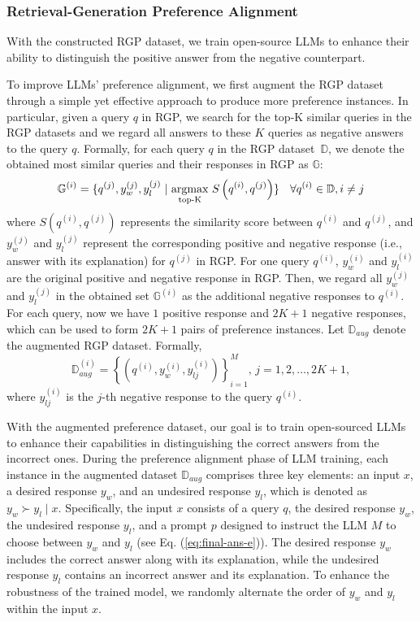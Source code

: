 \subsubsection{\textbf{Retrieval-Generation Preference Alignment}}
With the constructed RGP dataset, we train open-source LLMs to enhance their ability to distinguish the positive answer from the negative counterpart.

To improve LLMs' preference alignment, we first augment the RGP dataset through a simple yet effective approach to produce more preference instances. 
In particular, given a query $q$ in RGP, we search for the top-K similar queries in the RGP datasets and we regard all answers to these $K$ queries as negative answers to the query $q$.
Formally, for each query $q$ in the RGP dataset~$\mathbb{D}$,  we denote the obtained most similar queries and their responses in RGP as $\mathbb{G}$:  
\begin{equation} \label{eq:group}
    \small
    \mathbb{G}^{(i)} = \{ q^{(j)}, y_w^{(j)}, y_l^{(j)}~|~\underset{\text{top-}\mathrm{K}}{\mathrm{argmax}}\ S\left(q^{(i)}, q^{(j)}\right)\}~~~\forall q^{(i)} \in \mathbb{D}, i\neq j
\end{equation}
where $S(q^{(i)}, q^{(j)})$ represents the similarity score between $q^{(i)}$ and $q^{(j)}$, and $y_w^{(j)}$ and $y_l^{(j)}$ represent the corresponding positive and negative response (i.e., answer with its explanation) for $q^{(j)}$ in RGP.
For one query $q^{(i)}$, $y_w^{(i)}$ and $y_l^{(i)}$ are the original positive and negative response in RGP.
Then, we regard all $y_w^{(j)}$ and $y_l^{(j)}$ in the obtained set $\mathbb{G}^{(i)}$ as the additional negative responses to $q^{(i)}$.
For each query, now we have $1$ positive response and $2K+1$ negative responses, which can be used to form $2K+1$ pairs of preference instances. 
Let $\mathbb{D}_{aug}$ denote the augmented RGP dataset. Formally,
\begin{equation}
\mathbb{D}_{aug}^{(i)} = \left\{ \left( q^{(i)}, y_w^{(i)}, y_{lj}^{(i)} \right) \right\}_{i=1}^M, \, j=1,2,\dots,2K+1,
\end{equation}
where $y_{lj}^{(i)}$ is the $j$-th negative response to the query $q^{(i)}$. 

With the augmented preference dataset, our goal is to train open-sourced LLMs to enhance their capabilities in distinguishing the correct answers from the incorrect ones.
During the preference alignment phase of LLM training, each instance in the augmented dataset $\mathbb{D}_{aug}$ comprises three key elements: an input $x$, a desired response $y_w$, and an undesired response $y_l$,  which is denoted as $y_w \succ y_l \mid x$.
Specifically, the input $x$ consists of a query $q$, the desired response $y_w$, the undesired response $y_l$, and a prompt $p$ designed to instruct the LLM $M$ to choose between $y_w$ and $y_l$ (see Eq. (\ref{eq:final-ans-e})).
The desired response $y_w$ includes the correct answer along with its explanation, while the undesired response $y_l$ contains an incorrect answer and its explanation.
To enhance the robustness of the trained model, we randomly alternate the order of $y_w$ and $y_l$ within the input $x$.


